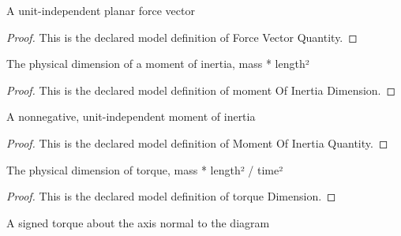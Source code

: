 \begin{definition}
  \label{def:physics:phyx-mini-0703:phyxminiproblems-problemphyxmini0703-forcevectorquantity}
  A unit-independent planar force vector
\end{definition}
\begin{proof}
  This is the declared model definition of Force Vector Quantity.
\end{proof}
\begin{definition}
  \label{def:physics:phyx-mini-0703:phyxminiproblems-problemphyxmini0703-momentofinertiadimension}
  The physical dimension of a moment of inertia, mass * length²
\end{definition}
\begin{proof}
  This is the declared model definition of moment Of Inertia Dimension.
\end{proof}
\begin{definition}
  \label{def:physics:phyx-mini-0703:phyxminiproblems-problemphyxmini0703-momentofinertiaquantity}
  A nonnegative, unit-independent moment of inertia
\end{definition}
\begin{proof}
  This is the declared model definition of Moment Of Inertia Quantity.
\end{proof}
\begin{definition}
  \label{def:physics:phyx-mini-0703:phyxminiproblems-problemphyxmini0703-torquedimension}
  The physical dimension of torque, mass * length² / time²
\end{definition}
\begin{proof}
  This is the declared model definition of torque Dimension.
\end{proof}
\begin{definition}
  \label{def:physics:phyx-mini-0703:phyxminiproblems-problemphyxmini0703-signedtorquequantity}
  A signed torque about the axis normal to the diagram
\end{definition}
